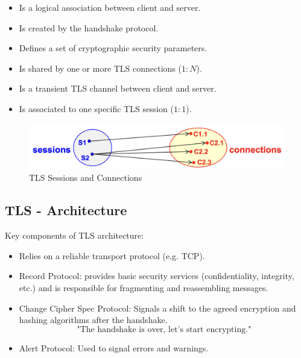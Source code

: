 \begin{multicols}{2}
    \raggedcolumns

    \begin{itemize}
        \item Is a logical association between client and server.
        \item Is created by the handshake protocol.
        \item Defines a set of cryptographic security parameters.
        \item Is shared by one or more TLS connections ($1:N$).
    \end{itemize}

    \columnbreak

    \begin{itemize}
        \item Is a transient TLS channel between client and server.
        \item Is associated to one specific TLS session ($1:1$).
    \end{itemize}
    \begin{figure}[H]
        \centering
        \includegraphics[width=\linewidth]{Images/Appsec/sess_conn.png}
        \caption{TLS Sessions and Connections}
    \end{figure}
\end{multicols}

\subsection{TLS - Architecture}
Key components of TLS architecture: 
\begin{itemize}
    \item Relies on a reliable transport protocol (e.g. TCP).
    \item Record Protocol: provides basic security services (confidentiality, integrity, etc.) and is responsible for fragmenting and reassembling messages.
    \item Change Cipher Spec Protocol: Signals a shift to the agreed encryption and hashing algorithms after the handshake.
    \[
        \text{"The handshake is over, let's start encrypting."}
    \]
    \item Alert Protocol: Used to signal errors and warnings.
\end{itemize}
    

